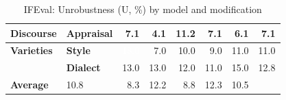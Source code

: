 \begin{table}[h]
{\begin{tabular}{llrrrrrr}
\midrule
\textbf{Discourse} & \textbf{Appraisal} & \cellcolor{blue!18} 7.1 & \cellcolor{blue!11} 4.1 & \cellcolor{blue!29} 11.2 & \cellcolor{blue!18} 7.1 & \cellcolor{blue!16} 6.1 & \cellcolor{blue!18} 7.1 \\
\midrule
\textbf{Varieties} & \textbf{Style} & \cellcolor{blue!46} \textcolor{white}{18.0} & \cellcolor{blue!18} 7.0 & \cellcolor{blue!26} 10.0 & \cellcolor{blue!23} 9.0 & \cellcolor{blue!28} 11.0 & \cellcolor{blue!28} 11.0 \\
  & \textbf{Dialect} & \cellcolor{blue!34} 13.0 & \cellcolor{blue!34} 13.0 & \cellcolor{blue!31} 12.0 & \cellcolor{blue!28} 11.0 & \cellcolor{blue!39} 15.0 & \cellcolor{blue!33} 12.8 \\
\midrule
\textbf{Average} &  \cellcolor{blue!28} 10.8 & \cellcolor{blue!21} 8.3 & \cellcolor{blue!32} 12.2 & \cellcolor{blue!23} 8.8 & \cellcolor{blue!32} 12.3 & \cellcolor{blue!27} 10.5 \\
\bottomrule
\end{tabular}}
\caption{IFEval: Unrobustness (U, \%) by model and modification}\label{tab:ifeval_unrob}
\end{table}